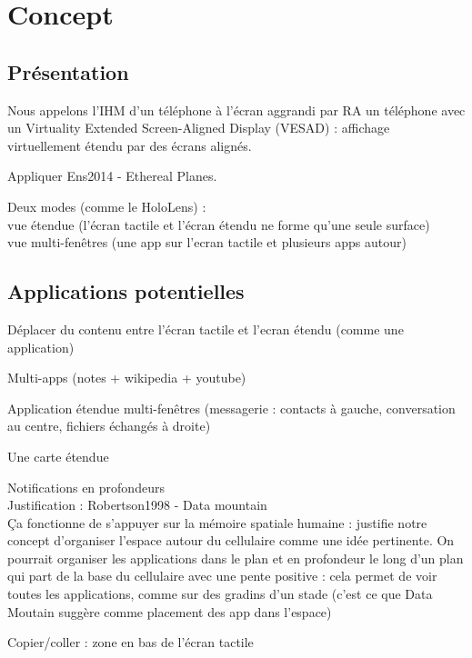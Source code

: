 \chapter{Concept}
\label{ch:concept}

\section{Présentation}

Nous appelons l'IHM d'un téléphone à l'écran aggrandi par RA un téléphone avec un \foreignlanguage{english}{Virtuality Extended Screen-Aligned Display} (VESAD) : affichage virtuellement étendu par des écrans alignés.

Appliquer Ens2014 - Ethereal Planes.

Deux modes (comme le HoloLens) :\\
vue étendue (l'écran tactile et l'écran étendu ne forme qu'une seule surface)\\
vue multi-fenêtres (une app sur l'ecran tactile et plusieurs apps autour)

\section{Applications potentielles}
Déplacer du contenu entre l'écran tactile et l'ecran étendu (comme une application)

Multi-apps (notes + wikipedia + youtube)

Application étendue multi-fenêtres (messagerie : contacts à gauche, conversation au centre, fichiers échangés à droite)

Une carte étendue

Notifications en profondeurs\\
Justification : Robertson1998 - Data mountain\\
Ça fonctionne de s'appuyer sur la mémoire spatiale humaine : justifie notre concept d'organiser l'espace autour du cellulaire comme une idée pertinente. On pourrait organiser les applications dans le plan et en profondeur le long d'un plan qui part de la base du cellulaire avec une pente positive : cela permet de voir toutes les applications, comme sur des gradins d'un stade (c'est ce que Data Moutain suggère comme placement des app dans l'espace)

Copier/coller : zone en bas de l'écran tactile